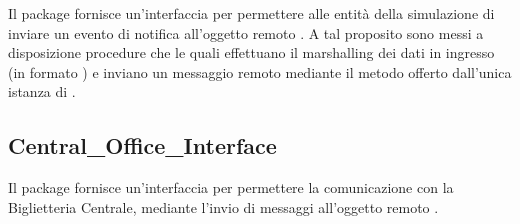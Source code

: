 	Il package  fornisce un'interfaccia per permettere alle entità della simulazione di inviare un evento di notifica all'oggetto remoto . A tal proposito sono messi a disposizione procedure che le quali effettuano il marshalling dei dati in ingresso (in formato ) e inviano un messaggio remoto mediante il metodo  offerto dall'unica istanza di .
	
	\subsection{Central\_Office\_Interface}
	
	Il package  fornisce un'interfaccia per permettere la comunicazione con la Biglietteria Centrale, mediante l'invio di messaggi all'oggetto remoto .
	
